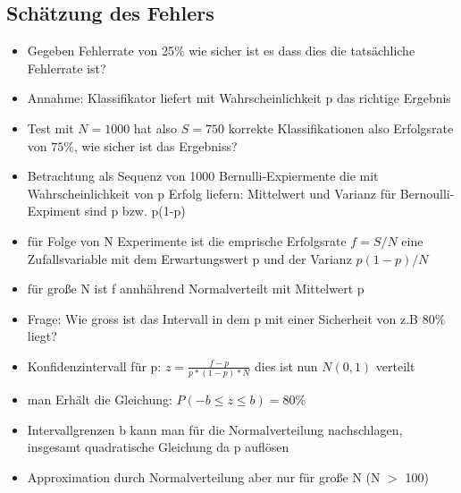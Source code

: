 \documentclass{article} %
\begin{document}
	\subsection{Schätzung des Fehlers}
	\begin{itemize}
		\item Gegeben Fehlerrate von 25\% wie sicher ist es dass dies die tatsächliche Fehlerrate ist?
		\item Annahme: Klassifikator liefert mit Wahrscheinlichkeit p das richtige Ergebnis
		\item Test mit $N=1000$ hat also $S=750$ korrekte Klassifikationen also Erfolgsrate von $75\%$, wie sicher ist das Ergebniss?
		\item Betrachtung als Sequenz von 1000 Bernulli-Expiermente die mit Wahrscheinlichkeit von p Erfolg liefern: Mittelwert und Varianz für Bernoulli-Expiment sind p bzw. p(1-p)
		\item für Folge von N Experimente ist die emprische Erfolgsrate $f=S/N$ eine Zufallsvariable mit dem Erwartungswert p und der Varianz $p(1-p)/N$
		\item für große N ist f annhährend Normalverteilt mit Mittelwert p
		\item Frage: Wie gross ist das Intervall in dem p mit einer Sicherheit von z.B $80\%$ liegt?
		\item Konfidenzintervall für p: $z = \frac{f-p}{p*(1-p)*N}$ dies ist nun $N(0,1)$ verteilt
		\item man Erhält die Gleichung: $P(-b\leq z \leq b) = 80\%$
		\item Intervallgrenzen b kann man für die Normalverteilung nachschlagen, insgesamt quadratische Gleichung da p auflösen
		\item Approximation durch Normalverteilung aber nur für große N (N $>$ 100)
	\end{itemize}
\end{document}
